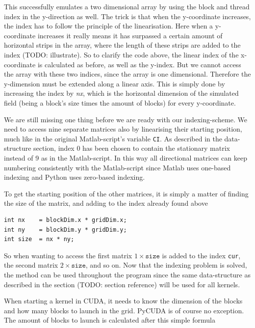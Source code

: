 This successfully emulates a two dimensional array by using the block and thread index in the y-direction as well. The trick is that when the y-coordinate increases, the index has to follow the principle of the linearisation. Here when a y-coordinate increases it really means it has surpassed a certain amount of horizontal strips in the array, where the length of these strips are added to the index (TODO: illustrate). So to clarify the code above, the linear index of the x-coordinate is calculated as before, as well as the y-index. But we cannot access the array with these two indices, since the array is one dimensional. Therefore the y-dimension must be extended along a linear axis. This is simply done by increasing the index by \textit{nx}, which is the horizontal dimension of the simulated field (being a block's size times the amount of blocks) for every y-coordinate.

We are still missing one thing before we are ready with our indexing-scheme. We need to access nine separate matrices also by linearising their starting position, much like in the original Matlab-script's variable \texttt{CI}. As described in the data-structure section, index 0 has been chosen to contain the stationary matrix instead of 9 as in the Matlab-script. In this way all directional matrices can keep numbering consistently with the Matlab-script since Matlab uses one-based indexing and Python uses zero-based indexing.

To get the starting position of the other matrices, it is simply a matter of finding the size of the matrix, and adding to the index already found above

\begin{verbatim}
int nx    = blockDim.x * gridDim.x;
int ny    = blockDim.y * gridDim.y;
int size  = nx * ny;
\end{verbatim}

So when wanting to access the first matrix $1 \times \mathrm{\texttt{size}}$ is added to the index \texttt{cur}, the second matrix $2 \times \mathrm{\texttt{size}}$, and so on. Now that the indexing problem is solved, the method can be used throughout the program since the same data-structure as described in the section (TODO: section reference) will be used for all kernels.

When starting a kernel in CUDA, it needs to know the dimension of the blocks and how many blocks to launch in the grid. PyCUDA is of course no exception. The amount of blocks to launch is calculated after this simple formula

